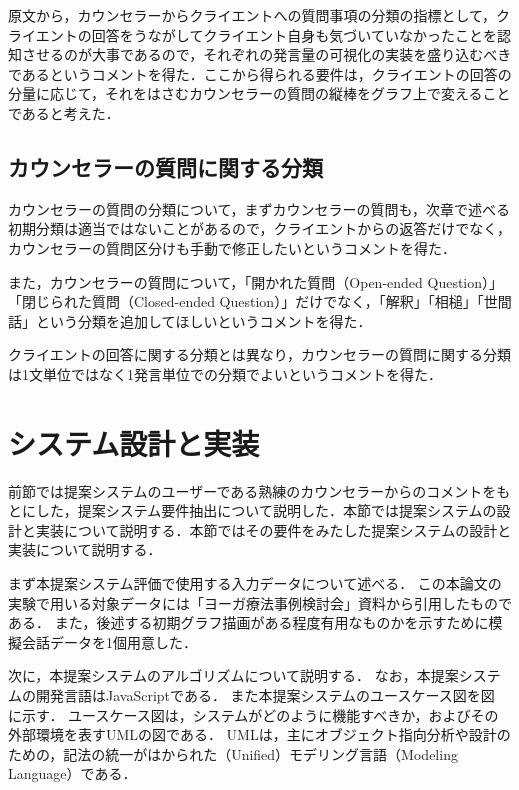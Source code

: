 \documentclass[shuuron]{kuee}
\begin{document}
原文から，カウンセラーからクライエントへの質問事項の分類の指標として，クライエントの回答をうながしてクライエント自身も気づいていなかったことを認知させるのが大事であるので，それぞれの発言量の可視化の実装を盛り込むべきであるというコメントを得た．ここから得られる要件は，クライエントの回答の分量に応じて，それをはさむカウンセラーの質問の縦棒をグラフ上で変えることであると考えた．

\subsection{カウンセラーの質問に関する分類}

カウンセラーの質問の分類について，まずカウンセラーの質問も，次章で述べる初期分類は適当ではないことがあるので，クライエントからの返答だけでなく，カウンセラーの質問区分けも手動で修正したいというコメントを得た．

また，カウンセラーの質問について，「開かれた質問（Open-ended Question）」「閉じられた質問（Closed-ended Question）」だけでなく，「解釈」「相槌」「世間話」という分類を追加してほしいというコメントを得た．

クライエントの回答に関する分類とは異なり，カウンセラーの質問に関する分類は1文単位ではなく1発言単位での分類でよいというコメントを得た．


\section{システム設計と実装}





前節では提案システムのユーザーである熟練のカウンセラーからのコメントをもとにした，提案システム要件抽出について説明した．本節では提案システムの設計と実装について説明する．本節ではその要件をみたした提案システムの設計と実装について説明する．



まず本提案システム評価で使用する入力データについて述べる．
この本論文の実験で用いる対象データには「ヨーガ療法事例検討会」資料から引用したものである．
また，後述する初期グラフ描画がある程度有用なものかを示すために模擬会話データを1個用意した．

次に，本提案システムのアルゴリズムについて説明する．
なお，本提案システムの開発言語はJavaScriptである．
また本提案システムのユースケース図を図
に示す．
ユースケース図は，システムがどのように機能すべきか，およびその外部環境を表すUMLの図である．
UMLは，主にオブジェクト指向分析や設計のための，記法の統一がはかられた（Unified）モデリング言語（Modeling Language）である．
\end{document}
